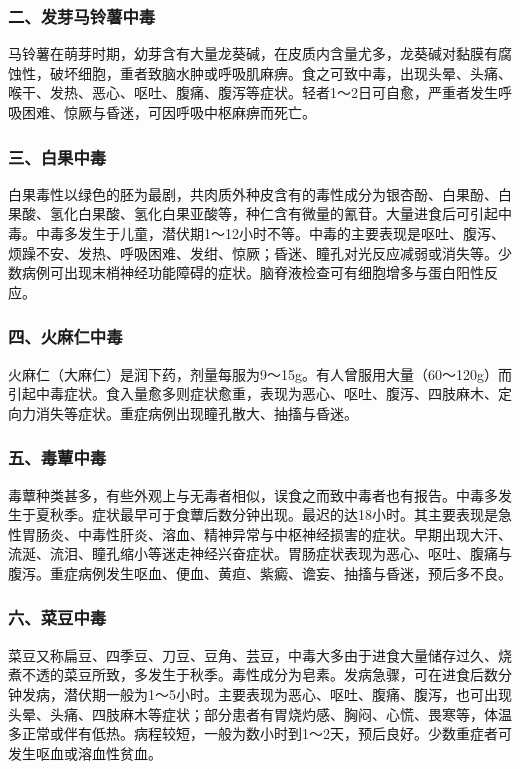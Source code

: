 \subsubsection{二、发芽马铃薯中毒}

马铃薯在萌芽时期，幼芽含有大量龙葵碱，在皮质内含量尤多，龙葵碱对黏膜有腐蚀性，破坏细胞，重者致脑水肿或呼吸肌麻痹。食之可致中毒，出现头晕、头痛、喉干、发热、恶心、呕吐、腹痛、腹泻等症状。轻者1～2日可自愈，严重者发生呼吸困难、惊厥与昏迷，可因呼吸中枢麻痹而死亡。

\subsubsection{三、白果中毒}

白果毒性以绿色的胚为最剧，共肉质外种皮含有的毒性成分为银杏酚、白果酚、白果酸、氢化白果酸、氢化白果亚酸等，种仁含有微量的氰苷。大量进食后可引起中毒。中毒多发生于儿童，潜伏期1～12小时不等。中毒的主要表现是呕吐、腹泻、烦躁不安、发热、呼吸困难、发绀、惊厥；昏迷、瞳孔对光反应减弱或消失等。少数病例可出现末梢神经功能障碍的症状。脑脊液检查可有细胞增多与蛋白阳性反应。

\subsubsection{四、火麻仁中毒}

火麻仁（大麻仁）是润下药，剂量每服为9～15g。有人曾服用大量（60～120g）而引起中毒症状。食入量愈多则症状愈重，表现为恶心、呕吐、腹泻、四肢麻木、定向力消失等症状。重症病例出现瞳孔散大、抽搐与昏迷。

\subsubsection{五、毒蕈中毒}

毒蕈种类甚多，有些外观上与无毒者相似，误食之而致中毒者也有报告。中毒多发生于夏秋季。症状最早可于食蕈后数分钟出现。最迟的达18小时。其主要表现是急性胃肠炎、中毒性肝炎、溶血、精神异常与中枢神经损害的症状。早期出现大汗、流涎、流泪、瞳孔缩小等迷走神经兴奋症状。胃肠症状表现为恶心、呕吐、腹痛与腹泻。重症病例发生呕血、便血、黄疸、紫癜、谵妄、抽搐与昏迷，预后多不良。

\subsubsection{六、菜豆中毒}

菜豆又称扁豆、四季豆、刀豆、豆角、芸豆，中毒大多由于进食大量储存过久、烧煮不透的菜豆所致，多发生于秋季。毒性成分为皂素。发病急骤，可在进食后数分钟发病，潜伏期一般为1～5小时。主要表现为恶心、呕吐、腹痛、腹泻，也可出现头晕、头痛、四肢麻木等症状；部分患者有胃烧灼感、胸闷、心慌、畏寒等，体温多正常或伴有低热。病程较短，一般为数小时到1～2天，预后良好。少数重症者可发生呕血或溶血性贫血。

